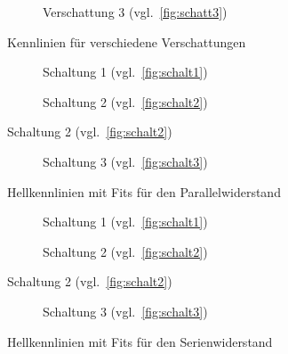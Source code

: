 \documentclass[slug=SZ, room=Hermann-Krone-Bau\,\ Labor\ 1.25,
supervisor=Martin\ Kroll, coursedate=14.\ 11.\ 2019]{../../Lab_Report_LaTeX/lab_report}
\begin{document}
\begin{figure}[H]\centering
  \ContinuedFloat
  \begin{subfigure}[b]{1\textwidth}\centering
    
    \caption{Verschattung 3 (vgl.~\ref{fig:schatt3})}
    \label{diag:verschattung3}
  \end{subfigure}
  \caption{Kennlinien für verschiedene Verschattungen}
  \label{fig:verschattung}
\end{figure}

\begin{figure}[H]\centering
  \begin{subfigure}[b]{1\textwidth}\centering
    
    \caption{Schaltung 1 (vgl.~\ref{fig:schalt1})}
    \label{diag:hellschalt1fit}
  \end{subfigure}
  \begin{subfigure}[b]{1\textwidth}\centering
    
    \caption{Schaltung 2 (vgl.~\ref{fig:schalt2})}
    \label{diag:hellschalt2fit}
  \end{subfigure}
\end{figure}

\begin{figure}[H]\centering
  \ContinuedFloat
  \begin{subfigure}[b]{1\textwidth}\centering
    
    \caption{Schaltung 3 (vgl.~\ref{fig:schalt3})}
    \label{diag:hellschalt3fit}
  \end{subfigure}
  \caption{Hellkennlinien mit Fits f\"ur den Parallelwiderstand}
  \label{fig:hellkennfit}
\end{figure}


\begin{figure}[H]\centering
  \begin{subfigure}[b]{1\textwidth}\centering
    
    \caption{Schaltung 1 (vgl.~\ref{fig:schalt1})}
    \label{diag:hellschalt1fit1}
  \end{subfigure}
  \begin{subfigure}[b]{1\textwidth}\centering
    
    \caption{Schaltung 2 (vgl.~\ref{fig:schalt2})}
    \label{diag:hellschalt2fit1}
  \end{subfigure}
\end{figure}

\begin{figure}[H]\centering
  \ContinuedFloat
  \begin{subfigure}[b]{1\textwidth}\centering
    
    \caption{Schaltung 3 (vgl.~\ref{fig:schalt3})}
    \label{diag:hellschalt3fit1}
  \end{subfigure}
  \caption{Hellkennlinien mit Fits f\"ur den Serienwiderstand}
  \label{fig:hellkennfit1}
\end{figure}
\end{document}
